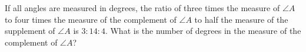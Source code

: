 If all angles are measured in degrees, the ratio of three times the measure of $\angle A$ to four times the measure of the complement of $\angle A$ to half the measure of the supplement of $\angle A$ is $3:14:4$. What is the number of degrees in the measure of the complement of $\angle A$?
